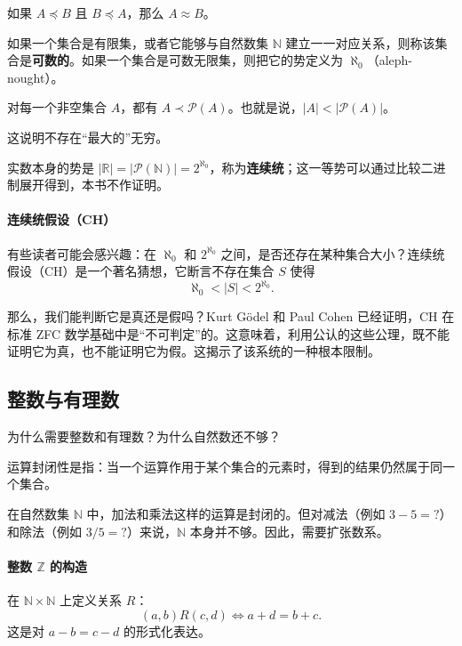 \begin{theorem}
如果 $A\preceq B$ 且 $B\preceq A$，那么 $A\approx B$。
\end{theorem}

\begin{definition}[可数集]
如果一个集合是有限集，或者它能够与自然数集 $\mathbb{N}$ 建立一一对应关系，则称该集合是\textbf{可数的}。如果一个集合是可数无限集，则把它的势定义为 $\aleph_0$（aleph-nought）。
\end{definition}

\begin{theorem}[Cantor 定理]
对每一个非空集合 $A$，都有 $A\prec \mathcal{P}(A)$。也就是说，$|A|<|\mathcal{P}(A)|$。
\end{theorem}
这说明不存在“最大的”无穷。

实数本身的势是 $|\mathbb{R}|=|\mathcal{P}(\mathbb{N})|=2^{\aleph_0}$，称为\textbf{连续统}；这一等势可以通过比较二进制展开得到，本书不作证明。

\paragraph{连续统假设（CH）}
有些读者可能会感兴趣：在 $\aleph_0$ 和 $2^{\aleph_0}$ 之间，是否还存在某种集合大小？连续统假设（CH）是一个著名猜想，它断言不存在集合 $S$ 使得
\[
\aleph_0<|S|<2^{\aleph_0}.
\]

那么，我们能判断它是真还是假吗？Kurt Gödel 和 Paul Cohen 已经证明，CH 在标准 ZFC 数学基础中是“不可判定”的。这意味着，利用公认的这些公理，既不能证明它为真，也不能证明它为假。这揭示了该系统的一种根本限制。

\subsection{整数与有理数}
为什么需要整数和有理数？为什么自然数还不够？
\begin{definition}[运算封闭性]
运算封闭性是指：当一个运算作用于某个集合的元素时，得到的结果仍然属于同一个集合。
\end{definition}
在自然数集 $\mathbb{N}$ 中，加法和乘法这样的运算是封闭的。但对减法（例如 $3-5=?$）和除法（例如 $3/5=?$）来说，$\mathbb{N}$ 本身并不够。因此，需要扩张数系。

\paragraph{整数 $\mathbb{Z}$ 的构造}
\begin{definition}
在 $\mathbb{N}\times \mathbb{N}$ 上定义关系 $R$：
\[
(a,b)R(c,d)\iff a+d=b+c.
\]
这是对 $a-b=c-d$ 的形式化表达。
\end{definition}

